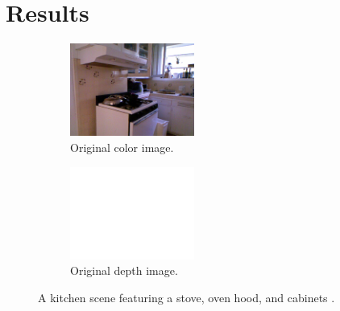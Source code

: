 
\section{Results}
\label{sec:results}

\begin{figure}[t!]
	\centering
	\begin{subfigure}[t]{0.5\textwidth}
		\centering
		\includegraphics[height=1.2in]{figs/Original321.png}
		\caption{Original color image.}
	\end{subfigure}

	\begin{subfigure}[t]{0.5\textwidth}
		\centering
		\includegraphics[height=1.2in]{figs/Depth321.png}
		\caption{Original depth image.}
	\end{subfigure}
	
	\caption{A kitchen scene featuring a stove, oven hood, and cabinets \cite{kinect}.}
	\label{fig:original}
\end{figure}